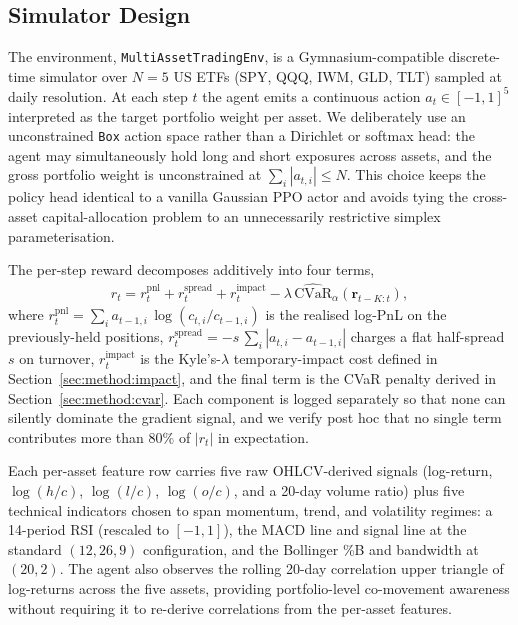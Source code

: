 \documentclass[conference]{IEEEtran}
\begin{document}
\subsection{Simulator Design}
\label{sec:method:sim}

The environment, \texttt{MultiAssetTradingEnv}, is a Gymnasium-compatible
discrete-time simulator over $N{=}5$ US ETFs (SPY, QQQ, IWM, GLD, TLT)
sampled at daily resolution. At each step $t$ the agent emits a
continuous action $a_t \in [-1, 1]^{5}$ interpreted as the target
portfolio weight per asset. We deliberately use an unconstrained
\texttt{Box} action space rather than a Dirichlet or softmax head: the
agent may simultaneously hold long and short exposures across assets,
and the gross portfolio weight is unconstrained at $\sum_i |a_{t,i}| \le
N$. This choice keeps the policy head identical to a vanilla Gaussian
PPO actor and avoids tying the cross-asset capital-allocation problem to
an unnecessarily restrictive simplex parameterisation.

The per-step reward decomposes additively into four terms,
\begin{align}
  r_t = r^{\text{pnl}}_t + r^{\text{spread}}_t
        + r^{\text{impact}}_t
        - \lambda\,\widehat{\mathrm{CVaR}}_\alpha(\mathbf{r}_{t-K:t}),
  \label{eq:reward}
\end{align}
where $r^{\text{pnl}}_t = \sum_i a_{t-1,i}\,\log(c_{t,i}/c_{t-1,i})$ is
the realised log-PnL on the previously-held positions,
$r^{\text{spread}}_t = -s\,\sum_i |a_{t,i}-a_{t-1,i}|$ charges a flat
half-spread $s$ on turnover, $r^{\text{impact}}_t$ is the Kyle's-$\lambda$
temporary-impact cost defined in
Section~\ref{sec:method:impact}, and the final term is the
CVaR penalty derived in Section~\ref{sec:method:cvar}. Each component is
logged separately so that none can silently dominate the gradient signal,
and we verify post hoc that no single term contributes more than $80\%$
of $|r_t|$ in expectation.

Each per-asset feature row carries five raw OHLCV-derived signals
(log-return, $\log(h/c)$, $\log(l/c)$, $\log(o/c)$, and a 20-day
volume ratio) plus five technical indicators chosen to span momentum,
trend, and volatility regimes: a 14-period RSI (rescaled to $[-1, 1]$),
the MACD line and signal line at the standard $(12, 26, 9)$
configuration, and the Bollinger \%B and bandwidth at $(20, 2)$. The
agent also observes the rolling 20-day correlation upper triangle of
log-returns across the five assets, providing portfolio-level
co-movement awareness without requiring it to re-derive correlations
from the per-asset features.
\end{document}
